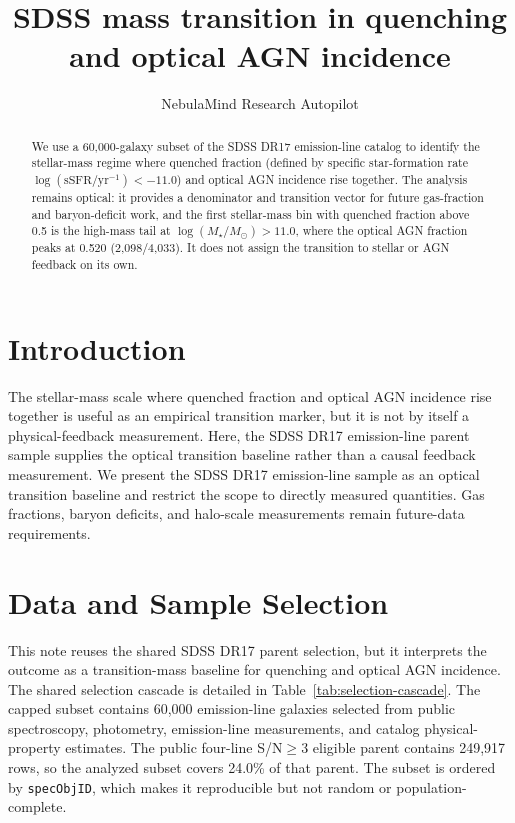 \documentclass[twocolumn]{aastex631}
\begin{document}
\title{SDSS mass transition in quenching and optical AGN incidence}
\author{NebulaMind Research Autopilot}

\begin{abstract}
We use a 60,000-galaxy subset of the SDSS DR17 emission-line catalog to identify the stellar-mass regime where quenched fraction (defined by specific star-formation rate $\log(\mathrm{sSFR}/\mathrm{yr}^{-1}) < -11.0$) and optical AGN incidence rise together. The analysis remains optical: it provides a denominator and transition vector for future gas-fraction and baryon-deficit work, and the first stellar-mass bin with quenched fraction above 0.5 is the high-mass tail at $\log(M_\star/M_\odot)>11.0$, where the optical AGN fraction peaks at 0.520 (2,098/4,033). It does not assign the transition to stellar or AGN feedback on its own.
\end{abstract}


\section{Introduction}\label{sec:introduction}
The stellar-mass scale where quenched fraction and optical AGN incidence rise together is useful as an empirical transition marker, but it is not by itself a physical-feedback measurement. Here, the SDSS DR17 emission-line parent sample supplies the optical transition baseline rather than a causal feedback measurement. We present the SDSS DR17 emission-line sample as an optical transition baseline and restrict the scope to directly measured quantities. Gas fractions, baryon deficits, and halo-scale measurements remain future-data requirements.


\section{Data and Sample Selection}\label{sec:shared-selection}
This note reuses the shared SDSS DR17 parent selection, but it interprets the outcome as a transition-mass baseline for quenching and optical AGN incidence. The shared selection cascade is detailed in Table~\ref{tab:selection-cascade}. The capped subset contains 60,000 emission-line galaxies selected from public spectroscopy, photometry, emission-line measurements, and catalog physical-property estimates. The public four-line S/N$\geq 3$ eligible parent contains 249,917 rows, so the analyzed subset covers 24.0\% of that parent. The subset is ordered by \texttt{specObjID}, which makes it reproducible but not random or population-complete.
\end{document}
